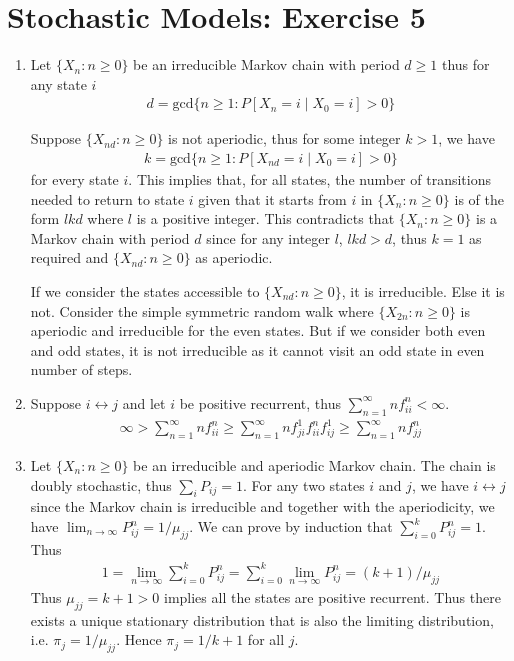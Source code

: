 \documentclass[a4paper,10pt]{article}
\theoremstyle{definition}
\begin{document}
\section*{Stochastic Models: Exercise 5}

\begin{enumerate}
\item Let $\{X_n: n\geq 0\}$ be an irreducible Markov chain with period $d \geq 1$ thus for any state $i$
\begin{align*}
d=\text{gcd}\{n\geq 1: P\left[X_n=i\mid X_0=i\right]>0\}
\end{align*}


Suppose $\{X_{nd}:n\geq 0\}$ is not aperiodic, thus for some integer $k>1$, we have
\begin{align*}  
k=\text{gcd}\{n\geq 1: P\left[X_{nd}=i\mid X_0=i\right]>0\}
\end{align*}
for every state $i$. This implies that, for all states, the number of transitions needed to return to state $i$ given that it starts from $i$ in $\{X_n: n\geq 0\}$ is of the form $lkd$ where $l$ is a positive integer. This contradicts that $\{X_n: n\geq 0\}$ is a Markov chain with period $d$ since for any integer $l$, $lkd>d$, thus $k=1$ as required and $\{X_{nd}: n\geq 0\}$ as aperiodic.

If we consider the states accessible to $\{X_{nd}: n\geq 0\}$, it is irreducible. Else it is not. Consider the simple symmetric random walk where $\{X_{2n}: n\geq 0\}$ is aperiodic and irreducible for the even states. But if we consider both even and odd states, it is not irreducible as it cannot visit an odd state in even number of steps.

\item Suppose $i \leftrightarrow j$ and let $i$ be positive recurrent, thus $\sum_{n=1}^{\infty}nf_{ii}^n<\infty$. 
\begin{align*}
\infty >\sum_{n=1}^{\infty}nf^n_{ii}\geq \sum_{n=1}^{\infty}nf^1_{ji}f_{ii}^nf^1_{ij}\geq \sum_{n=1}^{\infty}nf^n_{jj}
\end{align*}


\item Let $\{X_n:n\geq 0\}$ be an irreducible and aperiodic Markov chain. The chain is doubly stochastic, thus $\sum_{i}P_{ij}=1$. For any two states $i$ and $j$, we have $i \leftrightarrow j$ since the Markov chain is irreducible and together with the aperiodicity, we have $\lim_{n\to\infty}P_{ij}^n=1/\mu_{jj}$. We can prove by induction that $\sum^{k}_{i=0}P^n_{ij}=1$. Thus
\begin{align*}
1 = \lim_{n\to\infty}\sum_{i=0}^{k}P^n_{ij}=\sum_{i=0}^{k}\lim_{n\to\infty}P^n_{ij}=(k+1)/\mu_{jj}
\end{align*}
Thus $\mu_{jj}=k+1>0$ implies all the states are positive recurrent. Thus there exists a unique stationary distribution that is also the limiting distribution, i.e. $\pi_j = 1/\mu_{jj}$. Hence $\pi_j = 1/k+1$ for all $j$.


\end{enumerate}
\end{document}
